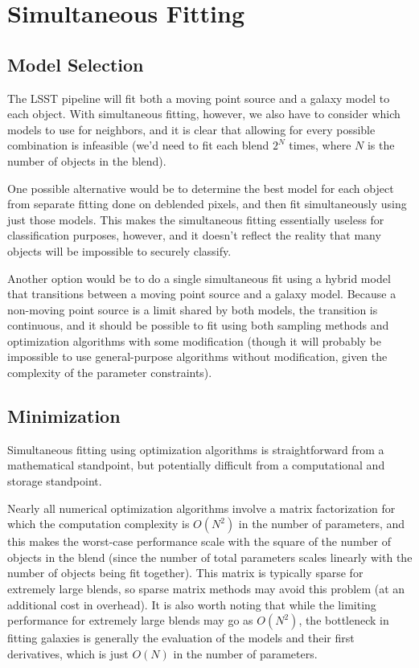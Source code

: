 \documentclass[10pt]{article}
\begin{document}
\section{Simultaneous Fitting}

\subsection{Model Selection}

\label{sec:model-selection}

The LSST pipeline will fit both a moving point source and a galaxy model to
each object.  With simultaneous fitting, however, we also have to consider
which models to use for neighbors, and it is clear that allowing for every
possible combination is infeasible (we'd need to fit each blend $2^N$ times,
where $N$ is the number of objects in the blend).

One possible alternative would be to determine the best model for each
object from separate fitting done on deblended pixels, and then fit
simultaneously using just those models.  This makes the simultaneous fitting
essentially useless for classification purposes, however, and it doesn't
reflect the reality that many objects will be impossible to securely classify.

Another option would be to do a single simultaneous fit using a hybrid model
that transitions between a moving point source and a galaxy model.  Because
a non-moving point source is a limit shared by both models, the transition is
continuous, and it should be possible to fit using both sampling methods and
optimization algorithms with some modification (though it will probably be
impossible to use general-purpose algorithms without modification, given the
complexity of the parameter constraints).

\subsection{Minimization}

Simultaneous fitting using optimization algorithms is straightforward from a
mathematical standpoint, but potentially difficult from a computational and
storage standpoint.

Nearly all numerical optimization algorithms involve a matrix factorization
for which the computation complexity is $O(N^2)$ in the number of parameters,
and this makes the worst-case performance scale with the square of the number
of objects in the blend (since the number of total parameters scales linearly
with the number of objects being fit together).  This matrix is typically
sparse for extremely large blends, so sparse matrix methods may avoid this
problem (at an additional cost in overhead).  It is also worth noting that
while the limiting performance for extremely large blends may go as $O(N^2)$,
the bottleneck in fitting galaxies is generally the evaluation of the
models and their first derivatives, which is just $O(N)$ in the number of
parameters.
\end{document}
